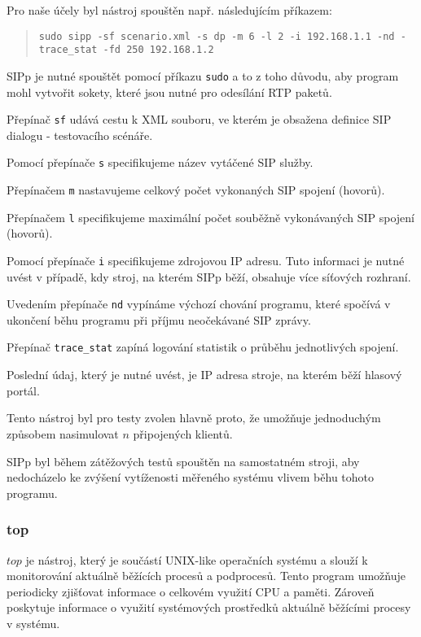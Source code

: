 \documentclass[ing,male,java,dept460]{diploma}						%
\begin{document}
Pro naše účely byl nástroj spouštěn např. následujícím příkazem:

\begin{quote}
\begin{sloppypar}
	\texttt{sudo sipp -sf scenario.xml -s dp -m 6 -l 2 -i 192.168.1.1 -nd -trace\_stat -fd 250 192.168.1.2}
\end{sloppypar}
\end{quote}

SIPp je nutné spouštět pomocí příkazu \texttt{sudo} a to z toho důvodu, aby program mohl vytvořit sokety, které jsou nutné pro odesílání RTP paketů.

Přepínač \texttt{sf} udává cestu k XML souboru, ve kterém je obsažena definice SIP dialogu - testovacího scénáře.

Pomocí přepínače \texttt{s} specifikujeme název vytáčené SIP služby.

Přepínačem \texttt{m} nastavujeme celkový počet vykonaných SIP spojení (hovorů).

Přepínačem \texttt{l} specifikujeme maximální počet souběžně vykonávaných SIP spojení (hovorů).

Pomocí přepínače \texttt{i} specifikujeme zdrojovou IP adresu. Tuto informaci je nutné uvést v případě, kdy stroj, na kterém SIPp běží, obsahuje více síťových rozhraní.

Uvedením přepínače \texttt{nd} vypínáme výchozí chování programu, které spočívá v ukončení běhu programu při příjmu neočekávané SIP zprávy.

Přepínač \texttt{trace\_stat} zapíná logování statistik o průběhu jednotlivých spojení.

Poslední údaj, který je nutné uvést, je IP adresa stroje, na kterém běží hlasový portál.

Tento nástroj byl pro testy zvolen hlavně proto, že umožňuje jednoduchým způsobem nasimulovat $n$ připojených klientů.

SIPp byl během zátěžových testů spouštěn na samostatném stroji, aby nedocházelo ke zvýšení vytíženosti měřeného systému vlivem běhu tohoto programu.

\subsubsection{top}
$top$ je nástroj, který je součástí UNIX-like operačních systému a slouží k monitorování aktuálně běžících procesů a podprocesů. Tento program umožňuje periodicky zjišťovat informace o celkovém využití CPU a paměti. Zároveň poskytuje informace o využití systémových prostředků aktuálně běžícími procesy v systému.
\end{document}

